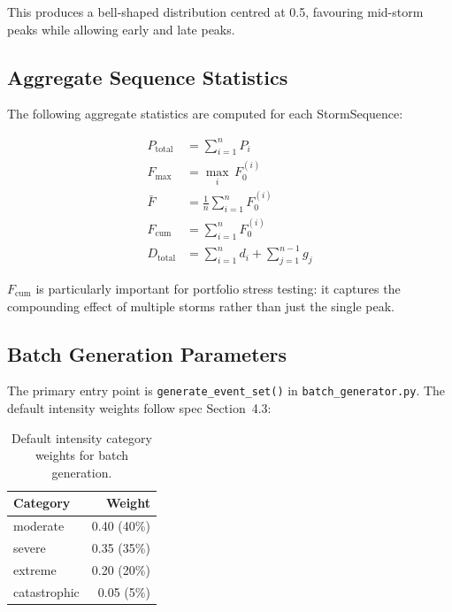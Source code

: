 \documentclass[11pt,a4paper]{article}
\begin{document}
\noindent This produces a bell-shaped distribution centred at 0.5, favouring
mid-storm peaks while allowing early and late peaks.

\subsection{Aggregate Sequence Statistics}

The following aggregate statistics are computed for each StormSequence:

\begin{align}
  P_{\text{total}} &= \sum_{i=1}^{n} P_i \label{eq:total_precip} \\
  F_{\max} &= \max_{i}\, F_0^{(i)} \label{eq:max_intensity} \\
  \bar{F} &= \frac{1}{n}\sum_{i=1}^{n} F_0^{(i)} \label{eq:avg_intensity} \\
  F_{\text{cum}} &= \sum_{i=1}^{n} F_0^{(i)} \label{eq:cum_intensity} \\
  D_{\text{total}} &= \sum_{i=1}^{n} d_i + \sum_{j=1}^{n-1} g_j \label{eq:total_duration}
\end{align}

\noindent $F_{\text{cum}}$ is particularly important for portfolio stress testing: it
captures the compounding effect of multiple storms rather than just the single peak.

\mkminputs

\subsection{Batch Generation Parameters}

The primary entry point is \texttt{generate\_event\_set()} in
\texttt{batch\_generator.py}. The default intensity weights follow spec Section~4.3:

\begin{table}[H]
  \centering
  \caption{Default intensity category weights for batch generation.}
  \label{tab:batch_weights}
  \begin{tabular}{lr}
    \toprule
    \textbf{Category} & \textbf{Weight} \\
    \midrule
    moderate     & 0.40 (40\%) \\
    severe       & 0.35 (35\%) \\
    extreme      & 0.20 (20\%) \\
    catastrophic & 0.05 (5\%) \\
    \bottomrule
  \end{tabular}
\end{table}
\end{document}
